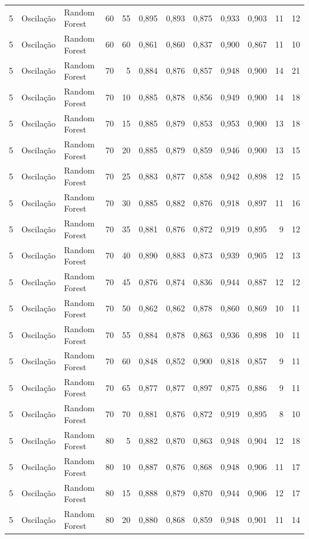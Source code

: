 \begin{longtable}{@{}rllrrrrrrrrr@{}}
5 & Oscilação & Random Forest & 60 & 55 & 0,895 & 0,893 & 0,875 & 0,933 & 0,903 & 11 & 12 \\
5 & Oscilação & Random Forest & 60 & 60 & 0,861 & 0,860 & 0,837 & 0,900 & 0,867 & 11 & 10 \\
5 & Oscilação & Random Forest & 70 & 5 & 0,884 & 0,876 & 0,857 & 0,948 & 0,900 & 14 & 21 \\
5 & Oscilação & Random Forest & 70 & 10 & 0,885 & 0,878 & 0,856 & 0,949 & 0,900 & 14 & 18 \\
5 & Oscilação & Random Forest & 70 & 15 & 0,885 & 0,879 & 0,853 & 0,953 & 0,900 & 13 & 18 \\
5 & Oscilação & Random Forest & 70 & 20 & 0,885 & 0,879 & 0,859 & 0,946 & 0,900 & 13 & 15 \\
5 & Oscilação & Random Forest & 70 & 25 & 0,883 & 0,877 & 0,858 & 0,942 & 0,898 & 12 & 15 \\
5 & Oscilação & Random Forest & 70 & 30 & 0,885 & 0,882 & 0,876 & 0,918 & 0,897 & 11 & 16 \\
5 & Oscilação & Random Forest & 70 & 35 & 0,881 & 0,876 & 0,872 & 0,919 & 0,895 & 9 & 12 \\
5 & Oscilação & Random Forest & 70 & 40 & 0,890 & 0,883 & 0,873 & 0,939 & 0,905 & 12 & 13 \\
5 & Oscilação & Random Forest & 70 & 45 & 0,876 & 0,874 & 0,836 & 0,944 & 0,887 & 12 & 12 \\
5 & Oscilação & Random Forest & 70 & 50 & 0,862 & 0,862 & 0,878 & 0,860 & 0,869 & 10 & 11 \\
5 & Oscilação & Random Forest & 70 & 55 & 0,884 & 0,878 & 0,863 & 0,936 & 0,898 & 10 & 11 \\
5 & Oscilação & Random Forest & 70 & 60 & 0,848 & 0,852 & 0,900 & 0,818 & 0,857 & 9 & 11 \\
5 & Oscilação & Random Forest & 70 & 65 & 0,877 & 0,877 & 0,897 & 0,875 & 0,886 & 9 & 11 \\
5 & Oscilação & Random Forest & 70 & 70 & 0,881 & 0,876 & 0,872 & 0,919 & 0,895 & 8 & 10 \\
5 & Oscilação & Random Forest & 80 & 5 & 0,882 & 0,870 & 0,863 & 0,948 & 0,904 & 12 & 18 \\
5 & Oscilação & Random Forest & 80 & 10 & 0,887 & 0,876 & 0,868 & 0,948 & 0,906 & 11 & 17 \\
5 & Oscilação & Random Forest & 80 & 15 & 0,888 & 0,879 & 0,870 & 0,944 & 0,906 & 12 & 17 \\
5 & Oscilação & Random Forest & 80 & 20 & 0,880 & 0,868 & 0,859 & 0,948 & 0,901 & 11 & 14 \\

\end{longtable}
